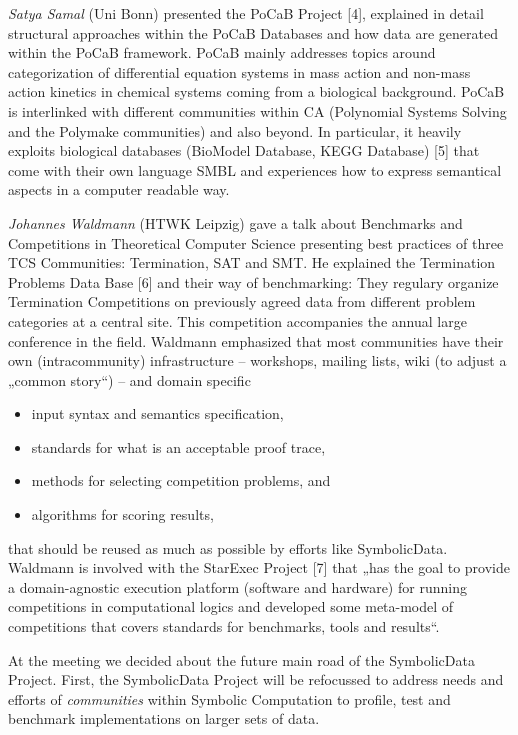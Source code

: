 \documentclass{article}
\begin{document}
\emph{Satya Samal} (Uni Bonn) presented the PoCaB Project [4], explained in
detail structural approaches within the PoCaB Databases and how data are
generated within the PoCaB framework. PoCaB mainly addresses topics around
categorization of differential equation systems in mass action and non-mass
action kinetics in chemical systems coming from a biological background. PoCaB
is interlinked with different communities within CA (Polynomial Systems
Solving and the Polymake communities) and also beyond. In particular, it
heavily exploits biological databases (BioModel Database, KEGG Database) [5]
that come with their own language SMBL and experiences how to express
semantical aspects in a computer readable way. 

\emph{Johannes Waldmann} (HTWK Leipzig) gave a talk about Benchmarks and
Competitions in Theoretical Computer Science presenting best practices of
three TCS Communities: Termination, SAT and SMT. He explained the Termination
Problems Data Base [6] and their way of benchmarking: They regulary organize
Termination Competitions on previously agreed data from different problem
categories at a central site. This competition accompanies the annual large
conference in the field. Waldmann emphasized that most communities have their
own (intracommunity) infrastructure -- workshops, mailing lists, wiki (to
adjust a „common story“) -- and domain specific
\begin{itemize}
\item input syntax and semantics specification,
\item standards for what is an acceptable proof trace,
\item methods for selecting competition problems, and
\item algorithms for scoring results,
\end{itemize}
that should be reused as much as possible by efforts like SymbolicData.
Waldmann is involved with the StarExec Project [7] that „has the goal to
provide a domain-agnostic execution platform (software and hardware) for
running competitions in computational logics and developed some meta-model of
competitions that covers standards for benchmarks, tools and results“.

At the meeting we decided about the future main road of the SymbolicData
Project. First, the SymbolicData Project will be refocussed to address needs
and efforts of \emph{communities} within Symbolic Computation to profile, test
and benchmark implementations on larger sets of data.
\end{document}
